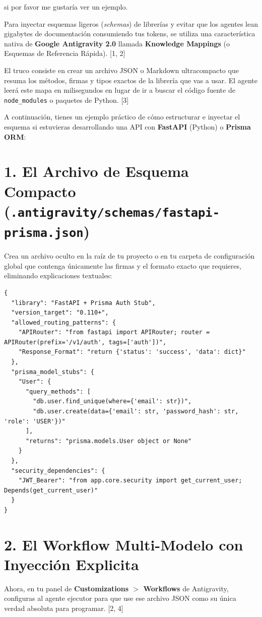 \documentclass[12pt, a4paper]{article}
\begin{document}
si por favor me gustaría ver un ejemplo.

Para inyectar esquemas ligeros (\textit{schemas}) de librerías y evitar que los agentes lean gigabytes de documentación consumiendo tus tokens, se utiliza una característica nativa de \textbf{Google Antigravity 2.0} llamada \textbf{Knowledge Mappings} (o Esquemas de Referencia Rápida). [1, 2]

El truco consiste en crear un archivo JSON o Markdown ultracompacto que resuma los métodos, firmas y tipos exactos de la librería que vas a usar. El agente leerá este mapa en milisegundos en lugar de ir a buscar el código fuente de \texttt{node\_modules} o paquetes de Python. [3]

A continuación, tienes un ejemplo práctico de cómo estructurar e inyectar el esquema si estuvieras desarrollando una API con \textbf{FastAPI} (Python) o \textbf{Prisma ORM}:

\section*{1. El Archivo de Esquema Compacto (\texttt{.antigravity/schemas/fastapi-prisma.json})}

Crea un archivo oculto en la raíz de tu proyecto o en tu carpeta de configuración global que contenga únicamente las firmas y el formato exacto que requieres, eliminando explicaciones textuales:

\begin{verbatim}
{
  "library": "FastAPI + Prisma Auth Stub",
  "version_target": "0.110+",
  "allowed_routing_patterns": {
    "APIRouter": "from fastapi import APIRouter; router = APIRouter(prefix='/v1/auth', tags=['auth'])",
    "Response_Format": "return {'status': 'success', 'data': dict}"
  },
  "prisma_model_stubs": {
    "User": {
      "query_methods": [
        "db.user.find_unique(where={'email': str})",
        "db.user.create(data={'email': str, 'password_hash': str, 'role': 'USER'})"
      ],
      "returns": "prisma.models.User object or None"
    }
  },
  "security_dependencies": {
    "JWT_Bearer": "from app.core.security import get_current_user; Depends(get_current_user)"
  }
}
\end{verbatim}

\section*{2. El Workflow Multi-Modelo con Inyección Explicita}

Ahora, en tu panel de \textbf{Customizations $>$ Workflows} de Antigravity, configuras al agente ejecutor para que use ese archivo JSON como su única verdad absoluta para programar. [2, 4]
\end{document}
